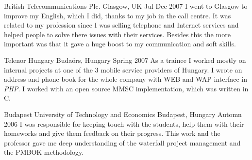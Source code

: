{British Telecommunications Plc.}
{Glasgow, UK}
{}
{Jul-Dec 2007}
{I went to Glasgow to improve my English, which I did, thanks to my job in the call centre. It was related to my profession since I was selling telephone and Internet services and helped people to solve there issues with their services. Besides this the more important was that it gave a huge boost to my communication and soft skills.}

{Telenor Hungary}
{Budaörs, Hungary}
{}
{Spring 2007}
{As a trainee I worked mostly on internal projects at one of the 3 mobile service providers of Hungary. I wrote an address and phone book for the whole company with WEB and WAP interface in \emph{PHP}. I worked with an open source MMSC implementation, which was written in C.}

{Budapest University of Technology and Economics}
{Budapest, Hungary}
{}
{Automn 2006}
{I was responsible for keeping touch with the students, help them with their homeworks and give them feedback on their progress. This work and the professor gave me deep understanding of the waterfall project management and the PMBOK methodology.}
